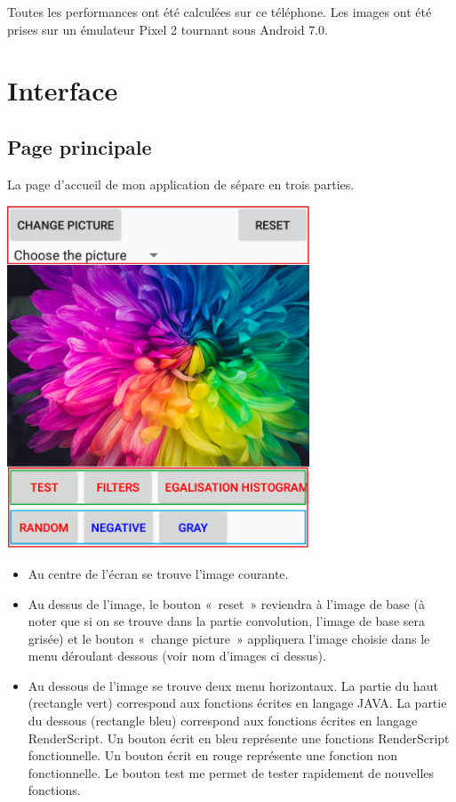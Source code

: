 \documentclass{article}
\begin{document}
Toutes les performances ont été calculées sur ce téléphone. 
Les images ont été prises sur un émulateur Pixel 2 tournant sous Android 7.0.
\newpage


\section{Interface}

\subsection{Page principale}
La page d'accueil de mon application de sépare en trois parties. 

\begin{center} 
    \includegraphics[width=9cm]{../Screen.png}
\end{center}

\begin{itemize}
    \item Au centre de l'écran se trouve l'image courante.
    \item Au dessus de l'image, le bouton « reset » reviendra à l'image de base (à noter que si on se trouve dans la partie convolution, l'image de base sera grisée) et le bouton « change picture » appliquera l'image choisie dans le menu déroulant dessous (voir nom d'images ci dessus).
    \item Au dessous de l'image se trouve deux menu horizontaux. La partie du haut (rectangle vert) correspond aux fonctions écrites en langage JAVA. La partie du dessous (rectangle bleu) correspond aux fonctions écrites en langage RenderScript.
    Un bouton écrit en bleu représente une fonctions RenderScript fonctionnelle. 
    Un bouton écrit en rouge représente une fonction non fonctionnelle.
    Le bouton test me permet de tester rapidement de nouvelles fonctions.
\end{itemize}
\end{document}
